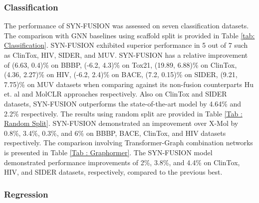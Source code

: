 \documentclass[sigconf,nonacm]{acmart}
\begin{document}
\subsubsection{Classification}
The performance of SYN-FUSION was assessed on seven classification datasets. The comparison with GNN baselines using scaffold split is provided in Table \ref{tab: Classification}. SYN-FUSION exhibited superior performance in 5 out of 7 such as  ClinTox, HIV, SIDER, and MUV.
SYN-FUSION has a relative improvement of (6.63, 0.4)\% on BBBP, (-6.2, 4.3)\% on Tox21, (19.89, 6.88)\% on ClinTox, (4.36, 2.27)\% on HIV, (-6.2, 2.4)\% on BACE, (7.2, 0.15)\% on SIDER, (9.21, 7.75)\% on MUV datasets when comparing against its non-fusion counterparts Hu et. al \cite{DBLP:conf/iclr/HuLGZLPL20} and MolCLR \cite{Wang_2022} approaches respectively. Also on ClinTox and SIDER datasets, SYN-FUSION outperforms the state-of-the-art model by 4.64\% and 2.2\% respectively.
The results using random split are provided in Table \ref{Tab : Random Split}. SYN-FUSION demonstrated an improvement over X-Mol \cite{XMOL-2022} by 0.8\%, 3.4\%, 0.3\%, and 6\% on BBBP, BACE, ClinTox, and HIV datasets respectively. The comparison involving Transformer-Graph combination networks is presented in Table \ref{Tab : Graphormer}. The SYN-FUSION model demonstrated performance improvements of 2\%, 3.8\%, and 4.4\% on ClinTox, HIV, and SIDER datasets, respectively, compared to the previous best.
\subsubsection{Regression} 
\end{document}
